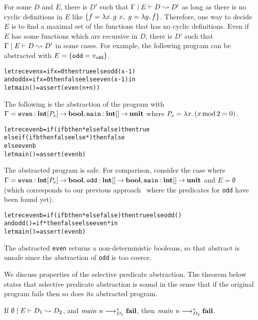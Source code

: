 For some $D$ and $E$, there is $D'$ such that
${\Gamma} \mid {E} \vdash {D} \leadsto {D'}$ as long as there is no cyclic definitions
in $E$ like $\{{f = \lambda{x}.\,{{g}~{x}},~ g = \lambda{y}.\,{f}}\}$.
Therefore, one way to decide $E$ is to find a maximal set of the
functions that has no cyclic definitions.
Even if $E$ has some functions which are recursive in $D$,
there is $D'$ such that ${\Gamma} \mid {E} \vdash {D} \leadsto {D'}$ in some cases.
For example, the following program can be abstracted with $E = \{{\mathtt{odd} = v_\mathtt{odd}}\}$.
\begin{alltt}
let rec even x = if x = 0 then true else odd (x-1)
    and odd x = if x = 0 then false else even (x-1) in
let main () = assert (even (n+n))
\end{alltt}
The following is the abstraction of the program with $\Gamma =
\mathtt{even}\mathbin{:}{\mathbf{int}[P_e]}\mathbin{\rightarrow}{\mathbf{bool}},
\mathtt{main}\mathbin{:}{\mathbf{int}[]}\mathbin{\rightarrow}{\mathbf{unit}}$ where $P_e = \lambda{x}.\,{(x
\mathop{\mathrm{mod}} 2 = 0})$.
\begin{alltt}
let rec even b = if (if b then * else false) then true
                 else if (if b then false else *) then false
                 else even b
let main () = assert (even b)
\end{alltt}
The abstracted program is safe.  For comparison, consider
the case where $\Gamma = \mathtt{even}\mathbin{:}{\mathbf{int}[P_e]}\mathbin{\rightarrow}{\mathbf{bool}},
\mathtt{odd}\mathbin{:}{\mathbf{int}[]}\mathbin{\rightarrow}{\mathbf{bool}},
\mathtt{main}\mathbin{:}{\mathbf{int}[]}\mathbin{\rightarrow}{\mathbf{unit}}$ and $E=\emptyset$ (which
corresponds to our previous approach~\cite{KobayashiPLDI2011} where the predicates for
\texttt{odd} have been found yet).
\begin{alltt}
let rec even b = if (if b then * else false) then true else odd ()
    and odd () = if * then false else even * in
let main () = assert (even b)
\end{alltt}
The abstracted \texttt{even} returns a non-deterministic booleans, so
that abstract is unsafe since the abstraction of \texttt{odd} is too
coerce.

We discuss properties of the selective predicate abstraction.
The theorem below states that selective predicate abstraction is sound
in the sense that if the original program fails then so does its
abstracted program.
\begin{theorem}[soundness]
 If ${\emptyset} \mid {E} \vdash {D_1} \leadsto {D_2}$, and
 ${\mathit{main}}~{n} \longrightarrow_{D_1}^* \mathbf{fail}$, then
 ${\mathit{main}}~{n} \longrightarrow_{D_2}^* \mathbf{fail}$.
\end{theorem}

